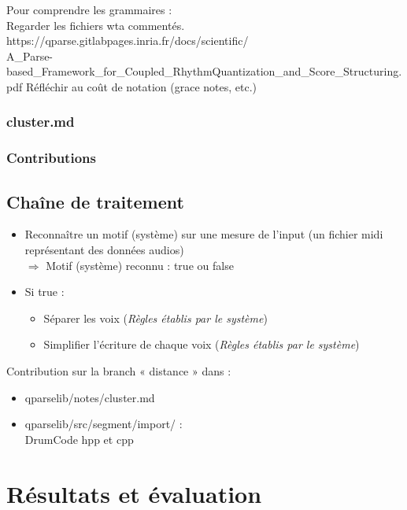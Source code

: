 Pour comprendre les grammaires :\\
Regarder les fichiers wta commentés.\\
https://qparse.gitlabpages.inria.fr/docs/scientific/\\
A\_Parse-based\_Framework\_for\_Coupled\_RhythmQuantization\_and\_Score\_Structuring.pdf
Réfléchir au coût de notation (grace notes, etc.)
\newpage

\subsubsection{cluster.md}
%

\subsubsection{Contributions}

\subsection*{Chaîne de traitement}
\begin{itemize}
	\item Reconnaître un motif (système) sur une mesure de l’input (un fichier midi représentant des données audios)\\ $\Rightarrow$ Motif (système) reconnu : true ou false
	\item Si true : 
	\begin{itemize}
		\item Séparer les voix (\textit{Règles établis par le système})
		\item Simplifier l’écriture de chaque voix (\textit{Règles établis par le système})\\
	\end{itemize}
\end{itemize}

Contribution sur la branch « distance » dans :\\
\begin{itemize}
	\item qparselib/notes/cluster.md
	\item qparselib/src/segment/import/ :\\
	DrumCode hpp et cpp\\
\end{itemize}
\newpage
\section{Résultats et évaluation}
